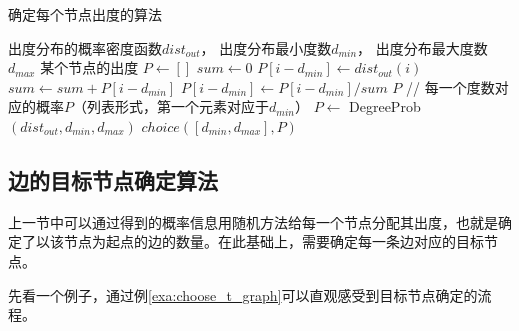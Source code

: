 % 

\begin{algorithm}[htb]
  \caption{确定每个节点出度的算法}
  \label{alg:DegreeDetermine}
  \begin{algorithmic}[1]
    \Require
      出度分布的概率密度函数$dist_{out}$，
      出度分布最小度数$d_{min}$，
      出度分布最大度数$d_{max}$
    \Ensure 某个节点的出度
      \State $P \gets []$
      \State $sum \gets 0$
        \State $P[i - d_{min}] \gets dist_{out}(i)$
        \State $sum \gets sum + P[i - d_{min}]$
      \EndFor
        \State $P[i - d_{min}] \gets P[i - d_{min}] / sum$
      \EndFor
      \State \Return $P$ // 每一个度数对应的概率$P$（列表形式，第一个元素对应于$d_{min}$）
    \EndFunction
    \State $P \gets$ DegreeProb$(dist_{out}, d_{min}, d_{max})$
      \State \Return $choice([d_{min}, d_{max}], P)$
    \EndFunction
  \end{algorithmic}
\end{algorithm}

\subsection{边的目标节点确定算法}
\label{cha:DetermineTarget}

上一节中可以通过得到的概率信息用随机方法给每一个节点分配其出度，也就是确定了以该节点为起点的边的数量。在此基础上，需要确定每一条边对应的目标节点。

先看一个例子，通过例\ref{exa:choose_t_graph}可以直观感受到目标节点确定的流程。


